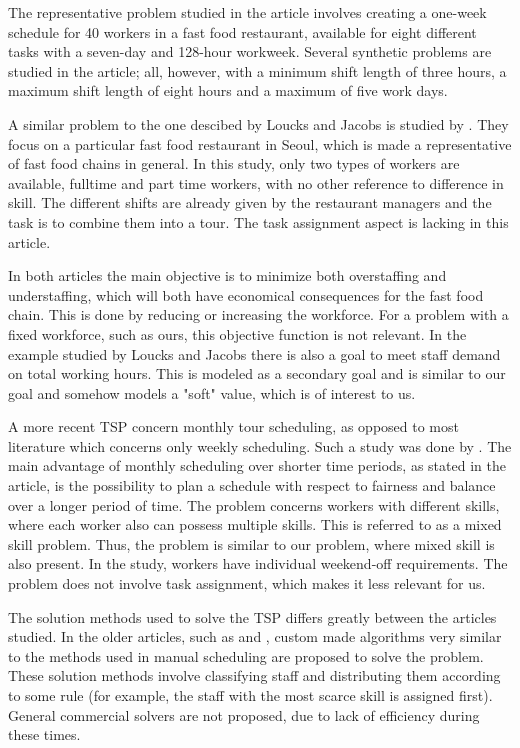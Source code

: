 The representative problem studied in the article involves creating a one-week schedule for 40 workers in a fast food restaurant, available for eight different tasks with a seven-day and 128-hour workweek. Several synthetic problems are studied in the article; all, however, with a minimum shift length of three hours, a maximum shift length of eight hours and a maximum of five work days.

A similar problem to the one descibed by Loucks and Jacobs is studied by \citet{choi_hwang_park_2009}. They focus on a particular fast food restaurant in Seoul, which is made a representative of fast food chains in general. In this study, only two types of workers are available, fulltime and part time workers, with no other reference to difference in skill. The different shifts are already given by the restaurant managers and the task is to combine them into a tour. The task assignment aspect is lacking in this article.


In both articles the main objective is to minimize both overstaffing and understaffing, which will both have economical consequences for the fast food chain. This is done by reducing or increasing the workforce. For a problem with a fixed workforce, such as ours, this objective function is not relevant. In the example studied by Loucks and Jacobs there is also a goal to meet staff demand on total working hours. This is modeled as a secondary goal and is similar to our goal and somehow models a "soft" value, which is of interest to us.

A more recent TSP concern monthly tour scheduling, as opposed to most literature which concerns only weekly scheduling. Such a study was done by \citet{rong_2010}. The main advantage of monthly scheduling over shorter time periods, as stated in the article, is the possibility to plan a schedule with respect to fairness and balance over a longer period of time. The problem concerns workers with different skills, where each worker also can possess multiple skills. This is referred to as a mixed skill problem. Thus, the problem is similar to our problem, where mixed skill is also present. In the study, workers have individual weekend-off requirements. The problem does not involve task assignment, which makes it less relevant for us.

The solution methods used to solve the TSP differs greatly between the articles studied. In the older articles, such as \citet{thompson_1988} and \citet{loucks_1991}, custom made algorithms very similar to the methods used in manual scheduling are proposed to solve the problem. These solution methods involve classifying staff and distributing them according to some rule (for example, the staff with the most scarce skill is assigned first). General commercial solvers are not proposed, due to lack of efficiency during these times. 

